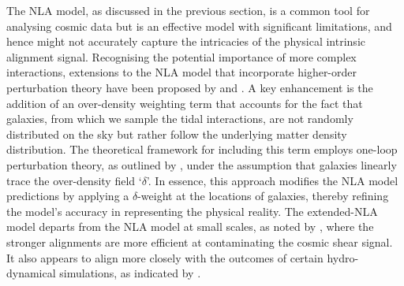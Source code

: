 The NLA model, as discussed in the previous section, is a common tool for analysing cosmic data but is an effective model with significant limitations, and hence might not accurately capture the intricacies of the physical intrinsic alignment signal. Recognising the potential importance of more complex interactions, extensions to the NLA model that incorporate higher-order perturbation theory have been proposed by \citet{Blazek2015} and  \citet{TATT}. 
A key enhancement is the addition of an  over-density weighting term that accounts for the fact that galaxies, from which we sample the tidal interactions, are not randomly distributed on the sky but rather follow the underlying matter density distribution. The theoretical framework for including this term employs one-loop perturbation theory, as outlined by \citep{TATT}, under the assumption that galaxies linearly trace the over-density field `$\delta$'.
In essence, this approach modifies the NLA model predictions by applying a $\delta$-weight at the locations of galaxies, thereby refining the model's accuracy in representing the physical reality.
The extended-NLA model departs from the NLA model at small scales, as noted by \citet{TATT}, where the stronger alignments are more efficient at contaminating the cosmic shear signal. 
It also appears to align more closely with the outcomes of certain hydro-dynamical simulations, as indicated by \citet{Hilbert_IA2017}.


